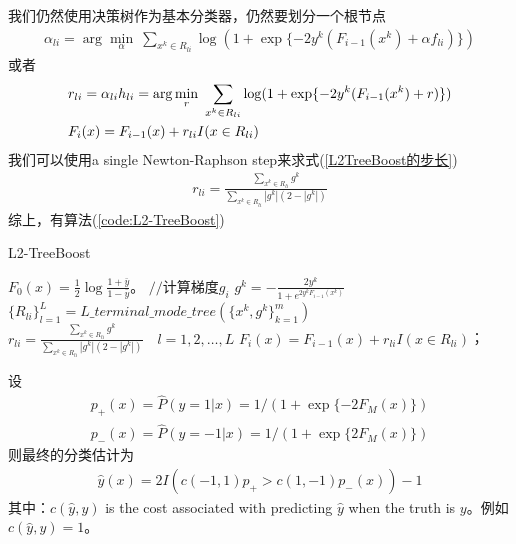               我们仍然使用决策树作为基本分类器，仍然要划分一个根节点
              \begin{align*}
              \alpha_{li} = \arg\min_\alpha \ \sum_{x^k\in R_{li}}\log (1+\exp\{-2y^k(F_{i-1}(x^k)+\alpha f_{li})\})
              \end{align*}
              或者
              \begin{align}
              \label{L2TreeBoost的步长}
              & r_{li} = \alpha_{li}h_{li} = \arg\min_r \ \sum_{x^k\in R_{li}} \log (1+\exp\{-2y^k(F_{i-1}(x^k)+r)\})\\
              & F_i(x) = F_{i-1}(x)+r_{li}I({x\in R_{li}}) \notag
              \end{align}
              我们可以使用a single Newton-Raphson step来求式(\ref{L2TreeBoost的步长})
              \begin{align*}
              r_{li} = \frac{\sum\limits_{x^k\in R_{li}} g^k}{\sum\limits_{x^k\in R_{li}}|g^k|(2-|g^k|)}
              \end{align*}
              综上，有算法(\ref{code:L2-TreeBoost})
              \begin{algorithm}[H]
                  \caption{L2-TreeBoost}\label{code:L2-TreeBoost}
                  \begin{algorithmic}[1]
                      \State $F_0(x) = \frac{1}{2}\log \frac{1+\bar{y}}{1-\bar{y}}$。
                          \State $//$计算梯度$g_i$
                              \State $g^k = -\frac{2y^k}{1+e^{2y^k F_{i-1}(x^k)}}$
                          \EndFor
                          \State $\{R_{li}\}_{l=1}^L = L\_terminal\_mode\_tree(\{x^k,g^k\}_{k=1}^m)$
                          \State $r_{li} = \frac{\sum\limits_{x^k\in R_{li}} g^k}{\sum\limits_{x^k\in R_{li}}|g^k|(2-|g^k|)}\quad l=1,2,\dots,L$
                          \State $F_i(x) = F_{i-1}(x)+r_{li}I({x\in R_{li}})$；
                      \EndFor
                  \end{algorithmic}
              \end{algorithm}
              \par
              设
              \begin{align*}
              p_+(x) = \hat{P}(y=1|x) = 1/(1+\exp\{-2F_M(x)\})\\
              p_-(x) = \hat{P}(y=-1|x) = 1/(1+\exp\{2F_M(x)\})
              \end{align*}
              则最终的分类估计为
              \begin{align*}
              \hat{y}(x) = 2I(c(-1,1)p_+>c(1,-1)p_-(x))-1
              \end{align*}
              其中：$c(\hat{y},y)$ is the cost associated with predicting $\hat{y}$ when the truth is $y$。例如$c(\hat{y},y) = 1$。
